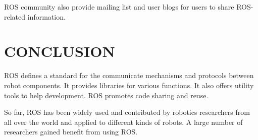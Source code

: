 \documentclass[a4paper, 10pt, conference]{ieeeconf}       %
\begin{document}
ROS community also provide mailing list and user blogs for users to share ROS-related information.

\section{CONCLUSION}

ROS defines a standard for the communicate mechanisms and protocols between robot components. It provides libraries for various functions. It also offers utility tools to help development. ROS promotes code sharing and reuse.

So far, ROS has been widely used and contributed by robotics researchers from all over the world and applied to different kinds of robots. A large number of researchers gained benefit from using ROS.



  
\end{document}
